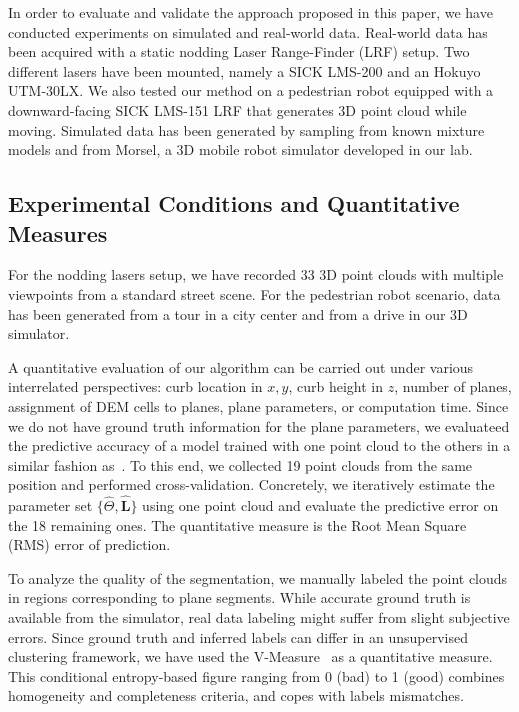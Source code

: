 In order to evaluate and validate the approach proposed in this paper, we have
conducted experiments on simulated and real-world data. Real-world data
has been acquired with a static nodding Laser Range-Finder (LRF) setup. Two
different lasers have been mounted, namely a SICK LMS-200 and an Hokuyo
UTM-30LX. We also tested our method on a pedestrian robot equipped with a
downward-facing SICK LMS-151 LRF that generates 3D point cloud while moving.
Simulated data has been generated by sampling from known mixture models and from
Morsel, a 3D mobile robot simulator developed in our lab.

\subsection{Experimental Conditions and Quantitative Measures}

For the nodding lasers setup, we have recorded 33 3D point clouds with multiple
viewpoints from a standard street scene. For the pedestrian robot scenario, data
has been generated from a tour in a city center and from a drive in our
3D simulator.

A quantitative evaluation of our algorithm can be carried out under various
interrelated perspectives: curb location in $x,y$, curb height in $z$,
number of planes, assignment of DEM cells to planes, plane parameters, or
computation time. Since we do not have ground truth information for the plane
parameters, we evaluateed the predictive accuracy of a model trained
with one point cloud to the others in a similar fashion as~\cite{faria10fitting}.
To this end, we collected 19 point clouds from the same position and performed
cross-validation. Concretely, we iteratively estimate the parameter set
$\{\hat{\Theta},\mathbf{\hat{L}}\}$ using one point cloud and evaluate the
predictive error on the 18 remaining ones. The quantitative measure is the Root
Mean Square (RMS) error of prediction.



To analyze the quality of the segmentation, we manually labeled the point clouds
in regions corresponding to plane segments. While accurate ground truth is
available from the simulator, real data labeling might suffer from slight
subjective errors. Since ground truth and inferred labels can differ in an
unsupervised clustering framework, we have used the
V-Measure~\cite{rosenberg07vmeasure} as a quantitative measure. This conditional
entropy-based figure ranging from 0 (bad) to 1 (good) combines homogeneity and
completeness criteria, and copes with labels mismatches.

